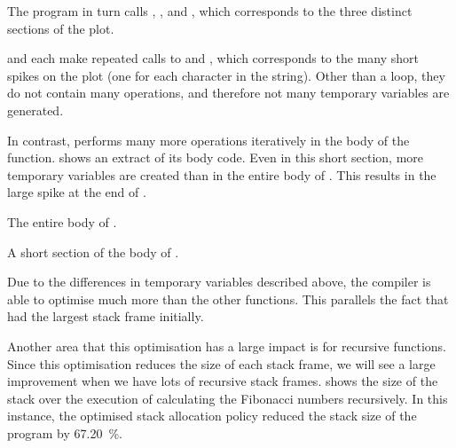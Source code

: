 \documentclass[00-main.tex]{subfiles}
\begin{document}
The program in turn calls , , and , which corresponds to the three distinct sections of the plot.

 and  each make repeated calls to  and , which corresponds to the many short spikes on the plot (one for each character in the string).
Other than a  loop, they do not contain many operations, and therefore not many temporary variables are generated.


In contrast,  performs many more operations iteratively in the body of the function.
 shows an extract of its body code.
Even in this short section, more temporary variables are created than in the entire body of .
This results in the large spike at the end of .

\begin{listing}[!ht]
  \caption{The entire body of .}
  \label{lst:caseupper body code}
\end{listing}

\begin{listing}[!ht]
  \caption{A short section of the body of .}
  \label{lst:section of casecamel body code}
\end{listing}

Due to the differences in temporary variables described above, the compiler is able to optimise  much more than the other functions.
This parallels the fact that  had the largest stack frame initially.


Another area that this optimisation has a large impact is for recursive functions.
Since this optimisation reduces the size of each stack frame, we will see a large improvement when we have lots of recursive stack frames.
 shows the size of the stack over the execution of calculating the Fibonacci numbers recursively.
In this instance, the optimised stack allocation policy reduced the stack size of the program by \SI{67.20}{\percent}.
\end{document}
